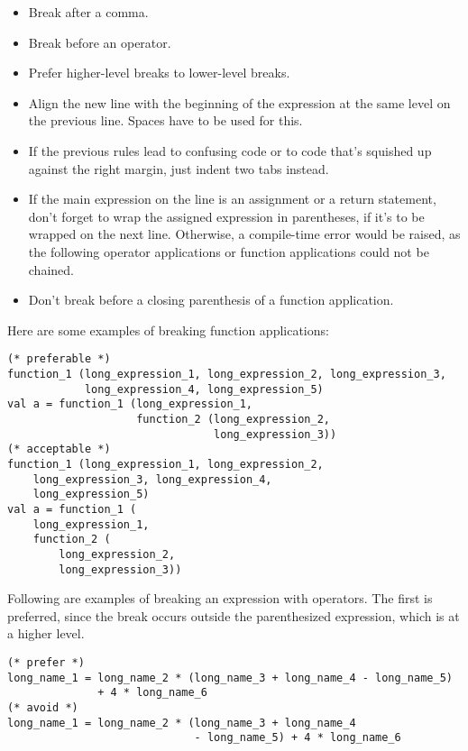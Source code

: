 \begin{itemize}
\item Break after a comma. 
\item Break before an operator. 
\item Prefer higher-level breaks to lower-level breaks. 
\item Align the new line with the beginning of the expression at the same level on the previous line. Spaces have to be used for this. 
\item If the previous rules lead to confusing code or to code that's squished up against the right margin, just indent two tabs instead. 
\item If the main expression on the line is an assignment or a return statement, don't forget to wrap the assigned expression in parentheses, if it's to be wrapped on the next line. Otherwise, a compile-time error would be raised, as the following operator applications or function applications could not be chained. 
\item Don't break before a closing parenthesis of a function application.  
\end{itemize}

\example Here are some examples of breaking function applications: 

\begin{lstlisting}
(* preferable *)
function_1 (long_expression_1, long_expression_2, long_expression_3,
            long_expression_4, long_expression_5)
val a = function_1 (long_expression_1,
                    function_2 (long_expression_2,
                                long_expression_3))
(* acceptable *)
function_1 (long_expression_1, long_expression_2, 
    long_expression_3, long_expression_4, 
    long_expression_5)
val a = function_1 (
    long_expression_1,
    function_2 (
        long_expression_2,
        long_expression_3))
\end{lstlisting}

\example Following are examples of breaking an expression with operators. The first is preferred, since the break occurs outside the parenthesized expression, which is at a higher level. 

\begin{lstlisting}
(* prefer *)
long_name_1 = long_name_2 * (long_name_3 + long_name_4 - long_name_5)
              + 4 * long_name_6
(* avoid *)
long_name_1 = long_name_2 * (long_name_3 + long_name_4 
                             - long_name_5) + 4 * long_name_6
\end{lstlisting}

